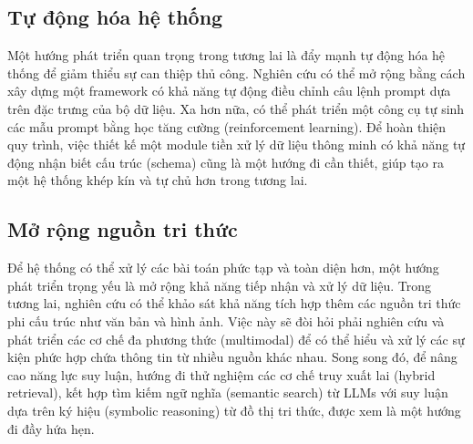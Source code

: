\subsection{Tự động hóa hệ thống}
Một hướng phát triển quan trọng trong tương lai là đẩy mạnh tự động hóa hệ thống để giảm thiểu sự can thiệp thủ công. Nghiên cứu có thể mở rộng bằng cách xây dựng một framework có khả năng tự động điều chỉnh câu lệnh prompt dựa trên đặc trưng của bộ dữ liệu. Xa hơn nữa, có thể phát triển một công cụ tự sinh các mẫu prompt bằng học tăng cường (reinforcement learning). Để hoàn thiện quy trình, việc thiết kế một module tiền xử lý dữ liệu thông minh có khả năng tự động nhận biết cấu trúc (schema) cũng là một hướng đi cần thiết, giúp tạo ra một hệ thống khép kín và tự chủ hơn trong tương lai.

\subsection{Mở rộng nguồn tri thức}
Để hệ thống có thể xử lý các bài toán phức tạp và toàn diện hơn, một hướng phát triển trọng yếu là mở rộng khả năng tiếp nhận và xử lý dữ liệu. Trong tương lai, nghiên cứu có thể khảo sát khả năng tích hợp thêm các nguồn tri thức phi cấu trúc như văn bản và hình ảnh. Việc này sẽ đòi hỏi phải nghiên cứu và phát triển các cơ chế đa phương thức (multimodal) để có thể hiểu và xử lý các sự kiện phức hợp chứa thông tin từ nhiều nguồn khác nhau. Song song đó, để nâng cao năng lực suy luận, hướng đi thử nghiệm các cơ chế truy xuất lai (hybrid retrieval), kết hợp tìm kiếm ngữ nghĩa (semantic search) từ LLMs với suy luận dựa trên ký hiệu (symbolic reasoning) từ đồ thị tri thức, được xem là một hướng đi đầy hứa hẹn.

